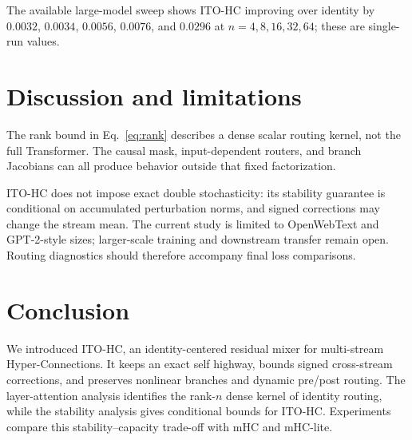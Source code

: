 \documentclass{article}
\begin{document}
The available large-model sweep shows ITO-HC improving over identity by $0.0032$, $0.0034$, $0.0056$, $0.0076$, and $0.0296$ at $n=4,8,16,32,64$; these are single-run values.

\section{Discussion and limitations}

The rank bound in Eq.~\ref{eq:rank} describes a dense scalar routing kernel, not the full Transformer. The causal mask, input-dependent routers, and branch Jacobians can all produce behavior outside that fixed factorization.

ITO-HC does not impose exact double stochasticity: its stability guarantee is conditional on accumulated perturbation norms, and signed corrections may change the stream mean. The current study is limited to OpenWebText and GPT-2-style sizes; larger-scale training and downstream transfer remain open. Routing diagnostics should therefore accompany final loss comparisons.

\section{Conclusion}

We introduced ITO-HC, an identity-centered residual mixer for multi-stream Hyper-Connections. It keeps an exact self highway, bounds signed cross-stream corrections, and preserves nonlinear branches and dynamic pre/post routing. The layer-attention analysis identifies the rank-$n$ dense kernel of identity routing, while the stability analysis gives conditional bounds for ITO-HC. Experiments compare this stability--capacity trade-off with mHC and mHC-lite.



\end{document}
